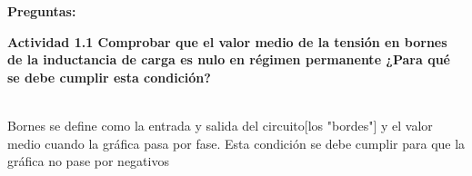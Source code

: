 ﻿\documentclass[letterpaper]{article}
\begin{document}
    \begin{LARGE}
     \textbf{Preguntas:}
     \end{LARGE}
 
 
 
 
 
 
 \begin{large}

\textbf{Actividad 1.1 Comprobar que el valor medio de la tensión en bornes
de la inductancia de carga es nulo en régimen permanente ¿Para qué
se debe cumplir esta condición?} \end{large}\\

    Bornes se define como la entrada y salida del circuito[los "bordes"] y el valor medio cuando la gráfica pasa por fase. Esta condición se debe cumplir para que la gráfica no pase por negativos
\end{document}
